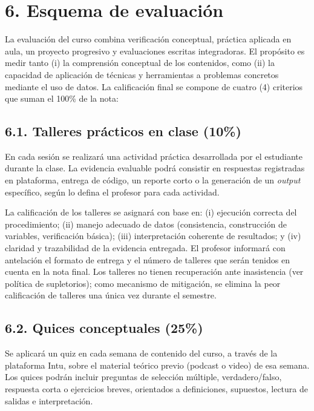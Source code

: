 \documentclass[11pt,a4paper]{article}
\begin{document}
\section*{6. Esquema de evaluación}

La evaluación del curso combina verificación conceptual, práctica aplicada en aula, un proyecto progresivo y evaluaciones escritas integradoras. El propósito es medir tanto (i) la comprensión conceptual de los contenidos, como (ii) la capacidad de aplicación de técnicas y herramientas a problemas concretos mediante el uso de datos. La calificación final se compone de cuatro (4) criterios que suman el 100\% de la nota:

\subsection*{6.1. Talleres prácticos en clase (10\%)}

En cada sesión se realizará una actividad práctica desarrollada por el estudiante durante la clase. La evidencia evaluable podrá consistir en respuestas registradas en plataforma, entrega de código, un reporte corto o la generación de un \textit{output} específico, según lo defina el profesor para cada actividad.

\vspace{0.3cm}

La calificación de los talleres se asignará con base en: (i) ejecución correcta del procedimiento; (ii) manejo adecuado de datos (consistencia, construcción de variables, verificación básica); (iii) interpretación coherente de resultados; y (iv) claridad y trazabilidad de la evidencia entregada. El profesor informará con antelación el formato de entrega y el número de talleres que serán tenidos en cuenta en la nota final. Los talleres no tienen recuperación ante inasistencia (ver política de supletorios); como mecanismo de mitigación, se elimina la peor calificación de talleres una única vez durante el semestre.

\subsection*{6.2. Quices conceptuales (25\%)}

Se aplicará un quiz en cada semana de contenido del curso, a través de la plataforma Intu, sobre el material teórico previo (podcast o video) de esa semana. Los quices podrán incluir preguntas de selección múltiple, verdadero/falso, respuesta corta o ejercicios breves, orientados a definiciones, supuestos, lectura de salidas e interpretación.
\end{document}

